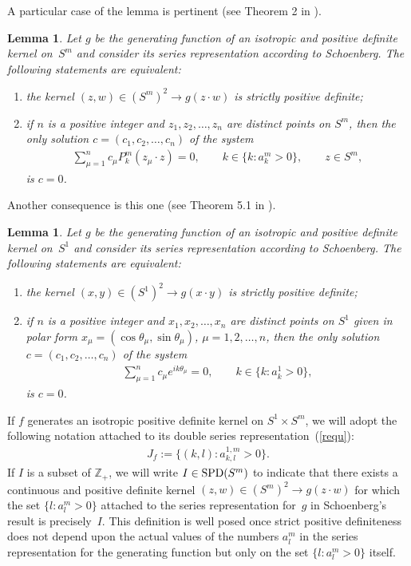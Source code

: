 \documentclass[pdftex]{sigma}
\numberwithin{equation}{section}
\newtheorem{Lemma}[Theorem]{Lemma}
\def\t{\theta}
\begin{document}
A particular case of the lemma is pertinent (see Theorem 2 in \cite{chen}).

\begin{Lemma} \label{spdm}
Let $g$ be the generating function of an isotropic and positive definite kernel on~$S^m$ and consider its series representation according to Schoenberg. The following statements are equivalent:
\begin{enumerate}\itemsep=0pt
\item[$(i)$] the kernel $(z,w) \in (S^m)^2 \to g(z \cdot w)$ is strictly positive definite;
\item[$(ii)$] if $n$ is a positive integer and $z_1,z_2, \ldots, z_n$ are distinct points on $S^{m}$, then the only solution $c=(c_1,c_2, \ldots, c_n)$ of the system
\begin{gather*}
\sum_{\mu=1}^n c_\mu P_k^m(z_\mu\cdot z)=0,\qquad k\in \big\{k\colon a_{k}^{m}>0\big\}, \qquad z\in S^m,
\end{gather*}
is $c=0$.
\end{enumerate}
\end{Lemma}

Another consequence is this one (see Theorem 5.1 in \cite{ron}).

\begin{Lemma} \label{spd1}
Let $g$ be the generating function of an isotropic and positive definite kernel on~$S^1$ and consider its series representation according to Schoenberg. The following statements are equivalent:
\begin{enumerate}\itemsep=0pt
\item[$(i)$] the kernel $(x, y) \in (S^1)^2 \to g(x \cdot y)$ is strictly positive definite;
\item[$(ii)$] if $n$ is a positive integer and $x_1,x_2, \ldots, x_n$ are distinct points on $S^{1}$ given in polar form $x_\mu=(\cos \t_\mu, \sin \t_\mu)$, $\mu=1,2,\ldots, n$, then the only solution $c=(c_1,c_2, \ldots, c_n)$ of the system
\begin{gather*}
\sum_{\mu=1}^n c_\mu e^{ik\t_\mu}=0,\qquad k\in \big\{k\colon a_{k}^{1}>0\big\},
\end{gather*}
is $c=0$.
\end{enumerate}
\end{Lemma}

If $f$ generates an isotropic positive def\/inite kernel on $S^1 \times S^m$, we will adopt the following notation attached to its double series representation~(\ref{requ}):
\begin{gather*}J_f:=\big\{(k,l)\colon a_{k,l}^{1,m}>0\big\}.\end{gather*}
If $I$ is a subset of $\mathbb{Z}_+$, we will write $I \in {\rm SPD}(S^m)$ to indicate that there exists a continuous and positive def\/inite kernel $(z,w) \in (S^m)^2 \to g(z \cdot w)$ for which the set $\{l\colon a_l^m>0\}$ attached to the series representation for~$g$ in Schoenberg's result is precisely~$I$. This def\/inition is well posed once strict positive def\/initeness does not depend upon the actual values of the numbers $a_l^m$ in the series representation for the generating function but only on the set $\{l\colon a_l^m>0\}$ itself.
\end{document}
